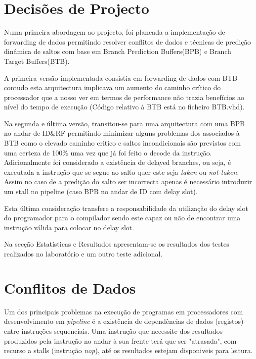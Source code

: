 \chapter{Decisões de Projecto}

Numa primeira abordagem ao projecto, foi planeada a implementação de forwarding de dados permitindo resolver conflitos de dados e técnicas de predição dinâmica de saltos com base em Branch Prediction Buffers(BPB) e Branch Target Buffers(BTB).

A primeira versão implementada consistia em forwarding de dados com BTB contudo esta arquitectura implicava um aumento do caminho crítico do processador que a nosso ver em termos de performance não trazia benefícios ao nível do tempo de execução (Código relativo à BTB está no ficheiro BTB.vhd).

Na segunda e última versão, transitou-se para uma arquitectura com uma BPB no andar de ID\&RF permitindo minimizar alguns problemas dos associados à BTB como o elevado caminho critíco e saltos incondicionais são previstos com uma certeza de 100\% uma vez que já foi feito o decode da instrução. Adicionalmente foi considerado a existência de delayed branches, ou seja, é executada a instrução que se segue ao salto quer este seja \textit{taken} ou \textit{not-taken}. 
Assim no caso de a predição do salto ser incorrecta apenas é necessário introduzir um stall no pipeline (caso BPB no andar de ID com delay slot). 

Esta última consideração transfere a responsabilidade da utilização do delay slot do programador para o compilador sendo este capaz ou não de encontrar uma instrução válida para colocar no delay slot.

Na secção Estatísticas e Resultados apresentam-se os resultados dos testes realizados no laboratório e um outro teste adicional.

\chapter{Conflitos de Dados}

Um dos principais problemas na execução de programas em processadores com desenvolvimento em \textit{pipeline} é a existência de dependências de dados (registos) entre instruções sequenciais. Uma instrução que necessite dos resultados produzidos pela instrução no andar à sua frente terá que ser "atrasada", com recurso a stalls (instrução \textit{nop}), até os resultados estejam disponiveis para leitura. 

